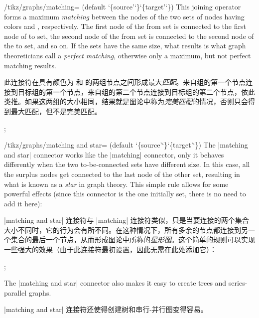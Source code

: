 \begin{key}{/tikz/graphs/matching= (default \char`\{source'\char`\}\char`\{target'\char`\})}
    This joining operator forms a maximum \emph{matching} between the nodes of
    the two sets of nodes having colors  and ,
    respectively. The first node of the from set is connected to the first node
    of to set, the second node of the from set is connected to the second node
    of the to set, and so on. If the sets have the same size, what results is
    what graph theoreticians call a \emph{perfect matching}, otherwise only a
    maximum, but not perfect matching results.
    
    此连接符在具有颜色为  和  的两组节点之间形成最大\emph{匹配}。来自组的第一个节点连接到目标组的第一个节点，来自组的第二个节点连接到目标组的第二个节点，依此类推。如果这两组的大小相同，结果就是图论中称为\emph{完美匹配}的情况，否则只会得到最大匹配，但不是完美匹配。
\begin{codeexample}[preamble={\usetikzlibrary{graphs}}]
\tikz {};
\end{codeexample}
\end{key}

\begin{key}{/tikz/graphs/matching and star= (default \char`\{source'\char`\}\char`\{target'\char`\})}
    The |matching and star| connector works like the |matching| connector, only
    it behaves differently when the two to-be-connected sets have different
    size. In this case, all the surplus nodes get connected to the last node of
    the other set, resulting in what is known as a \emph{star} in graph theory.
    This simple rule allows for some powerful effects (since this connector is
    the one initially set, there is no need to add it here):
    
    |matching and star| 连接符与 |matching| 连接符类似，只是当要连接的两个集合大小不同时，它的行为会有所不同。在这种情况下，所有多余的节点都连接到另一个集合的最后一个节点，从而形成图论中所称的\emph{星形图}。这个简单的规则可以实现一些强大的效果（由于此连接符最初设置，因此无需在此处添加它）：
\begin{codeexample}[preamble={\usetikzlibrary{graphs}}]
\tikz {};
\end{codeexample}
    The |matching and star| connector also makes it easy to create trees and
    series-parallel graphs.

    |matching and star| 连接符还使得创建树和串行-并行图变得容易。
\end{key}

